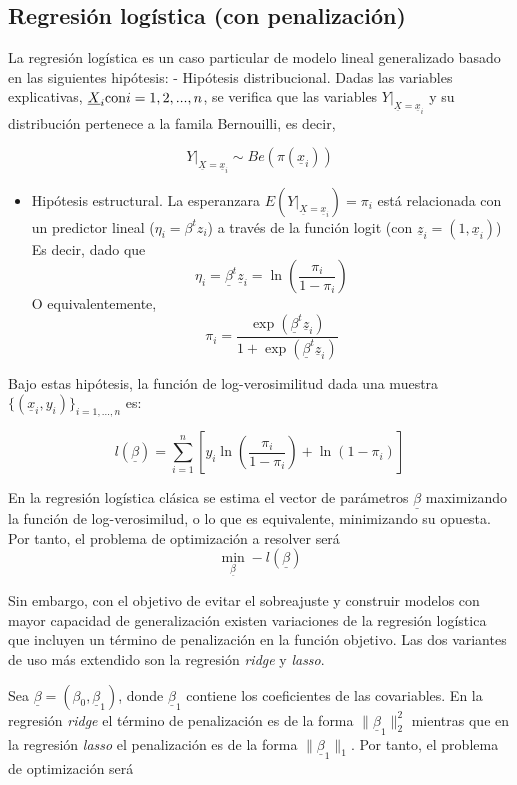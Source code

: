 \documentclass[12pt,a4paper,]{book}
\providecommand{\tightlist}{%
  \setlength{\itemsep}{0pt}\setlength{\parskip}{0pt}}
\numberwithin{dummy}{section}
\theoremstyle{ocrenumbox}
\theoremstyle{blacknumex}
\theoremstyle{blacknumbox}
\theoremstyle{ocrenum}
\theoremstyle{ocrenum}
\begin{document}
\hypertarget{regresiuxf3n-loguxedstica-con-penalizaciuxf3n}{%
\subsection{Regresión logística (con
penalización)}\label{regresiuxf3n-loguxedstica-con-penalizaciuxf3n}}

La regresión logística es un caso particular de modelo lineal
generalizado basado en las siguientes hipótesis: - Hipótesis
distribucional. Dadas las variables explicativas,
\(\underline X_i \space \space \text{con} \space \space i = 1,2,...,n\),
se verifica que las variables \(Y|_{\underline X= \underline x_i}\) y su
distribución pertenece a la famila Bernouilli, es decir,

\[Y|_{\underline X= \underline x_i} \sim Be(\pi( \underline x_i))\]

\begin{itemize}
\tightlist
\item
  Hipótesis estructural. La esperanzara
  \(E(Y|_{\underline X= \underline x_i}) = \pi_i\) está relacionada con
  un predictor lineal (\(\eta_i = \beta^t z_i\)) a través de la función
  logit (con \(\underline z_i = \left(1,\underline x_i\right)\)) Es
  decir, dado que
  \[\eta_i = \underline \beta^t \underline z_i= \ln(\frac{\pi_i}{1-\pi_i}) \]
  O equivalentemente,
  \[\pi_i = \frac{\exp(\underline \beta^t \underline z_i)}{1 + \exp(\underline \beta^t \underline z_i)}\]
\end{itemize}

Bajo estas hipótesis, la función de log-verosimilitud dada una muestra
\(\{ (\underline x_i,y_i) \}_{i=1,...,n}\) es:

\[ l(\underline \beta) = 
\sum_{i=1}^n \left[ 
y_i\ln \left( \frac{\pi_i}{1-\pi_i} \right) + 
\ln \left( 1 - \pi_i\right) \right]\]

En la regresión logística clásica se estima el vector de parámetros
\(\underline \beta\) maximizando la función de log-verosimilud, o lo que
es equivalente, minimizando su opuesta. Por tanto, el problema de
optimización a resolver será
\[\min_{\underline \beta} -l(\underline \beta)\]

Sin embargo, con el objetivo de evitar el sobreajuste y construir
modelos con mayor capacidad de generalización existen variaciones de la
regresión logística que incluyen un término de penalización en la
función objetivo. Las dos variantes de uso más extendido son la
regresión \emph{ridge} y \emph{lasso}.

Sea \(\underline \beta = \left( \beta_0, \underline \beta_1 \right)\),
donde \(\underline \beta_1\) contiene los coeficientes de las
covariables. En la regresión \emph{ridge} el término de penalización es
de la forma \(\| \underline \beta_1 \|^2_2\) mientras que en la
regresión \emph{lasso} el penalización es de la forma
\(\| \underline \beta_1 \|_1\). Por tanto, el problema de optimización
será
\end{document}
